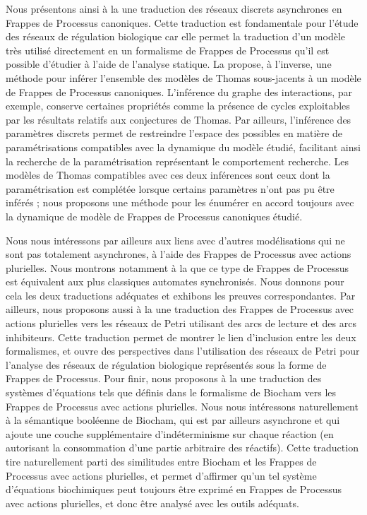 Nous présentons ainsi à la  une traduction des réseaux discrets asynchrones
en Frappes de Processus canoniques.
Cette traduction est fondamentale pour l'étude des réseaux de régulation biologique
car elle permet la traduction d'un modèle très utilisé directement en un formalisme
de Frappes de Processus qu'il est possible d'étudier à l'aide de l'analyse statique.
La  propose, à l'inverse, une méthode pour inférer l'ensemble des modèles
de Thomas sous-jacents à un modèle de Frappes de Processus canoniques.
L'inférence du graphe des interactions, par exemple,
conserve certaines propriétés comme la présence de cycles
exploitables par les résultats relatifs aux conjectures de Thomas.
Par ailleurs, l'inférence des paramètres discrets permet de restreindre l'espace des possibles
en matière de paramétrisations compatibles avec la dynamique du modèle étudié,
facilitant ainsi la recherche de la paramétrisation représentant le comportement recherche.
Les modèles de Thomas compatibles avec ces deux inférences sont ceux dont la paramétrisation
est complétée lorsque certains paramètres n'ont pas pu être inférés ;
nous proposons une méthode pour les énumérer en accord toujours avec la dynamique
de modèle de Frappes de Processus canoniques étudié.

Nous nous intéressons par ailleurs aux liens avec d'autres modélisations
qui ne sont pas totalement asynchrones,
à l'aide des Frappes de Processus avec actions plurielles.
Nous montrons notamment à la  que ce type de Frappes de Processus
est équivalent aux plus classiques automates synchronisés.
Nous donnons pour cela les deux traductions adéquates et exhibons les preuves correspondantes.
Par ailleurs, nous proposons aussi à la 
une traduction des Frappes de Processus avec actions
plurielles vers les réseaux de Petri utilisant des arcs de lecture et des arcs inhibiteurs.
Cette traduction permet de montrer le lien d'inclusion entre les deux formalismes,
et ouvre des perspectives dans l'utilisation des réseaux de Petri pour l'analyse des réseaux
de régulation biologique représentés sous la forme de Frappes de Processus.
Pour finir, nous proposons à la  une traduction des systèmes d'équations tels
que définis dans le formalisme de Biocham vers les Frappes de Processus avec actions plurielles.
Nous nous intéressons naturellement à la sémantique booléenne de Biocham,
qui est par ailleurs asynchrone et qui ajoute une couche supplémentaire d'indéterminisme
sur chaque réaction (en autorisant la consommation d'une partie arbitraire des réactifs).
Cette traduction tire naturellement parti des similitudes entre Biocham et les Frappes
de Processus avec actions plurielles, et permet d'affirmer
qu'un tel système d'équations biochimiques peut toujours être exprimé
en Frappes de Processus avec actions plurielles,
et donc être analysé avec les outils adéquats.



